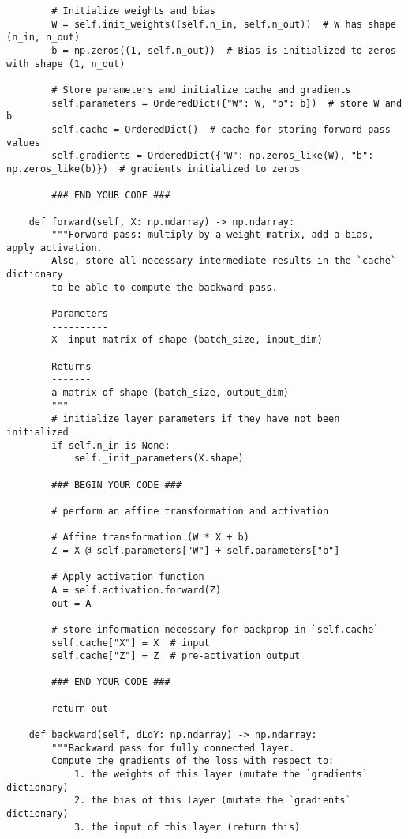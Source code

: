 \documentclass{article}
\begin{document}
\begin{enumerate}
\begin{verbatim}
        # Initialize weights and bias
        W = self.init_weights((self.n_in, self.n_out))  # W has shape (n_in, n_out)
        b = np.zeros((1, self.n_out))  # Bias is initialized to zeros with shape (1, n_out)

        # Store parameters and initialize cache and gradients
        self.parameters = OrderedDict({"W": W, "b": b})  # store W and b
        self.cache = OrderedDict()  # cache for storing forward pass values
        self.gradients = OrderedDict({"W": np.zeros_like(W), "b": np.zeros_like(b)})  # gradients initialized to zeros

        ### END YOUR CODE ###

    def forward(self, X: np.ndarray) -> np.ndarray:
        """Forward pass: multiply by a weight matrix, add a bias, apply activation.
        Also, store all necessary intermediate results in the `cache` dictionary
        to be able to compute the backward pass.

        Parameters
        ----------
        X  input matrix of shape (batch_size, input_dim)

        Returns
        -------
        a matrix of shape (batch_size, output_dim)
        """
        # initialize layer parameters if they have not been initialized
        if self.n_in is None:
            self._init_parameters(X.shape)

        ### BEGIN YOUR CODE ###
        
        # perform an affine transformation and activation

        # Affine transformation (W * X + b)
        Z = X @ self.parameters["W"] + self.parameters["b"]

        # Apply activation function
        A = self.activation.forward(Z)
        out = A
        
        # store information necessary for backprop in `self.cache`
        self.cache["X"] = X  # input
        self.cache["Z"] = Z  # pre-activation output

        ### END YOUR CODE ###

        return out

    def backward(self, dLdY: np.ndarray) -> np.ndarray:
        """Backward pass for fully connected layer.
        Compute the gradients of the loss with respect to:
            1. the weights of this layer (mutate the `gradients` dictionary)
            2. the bias of this layer (mutate the `gradients` dictionary)
            3. the input of this layer (return this)


\end{verbatim}
\end{enumerate}
\end{document}
